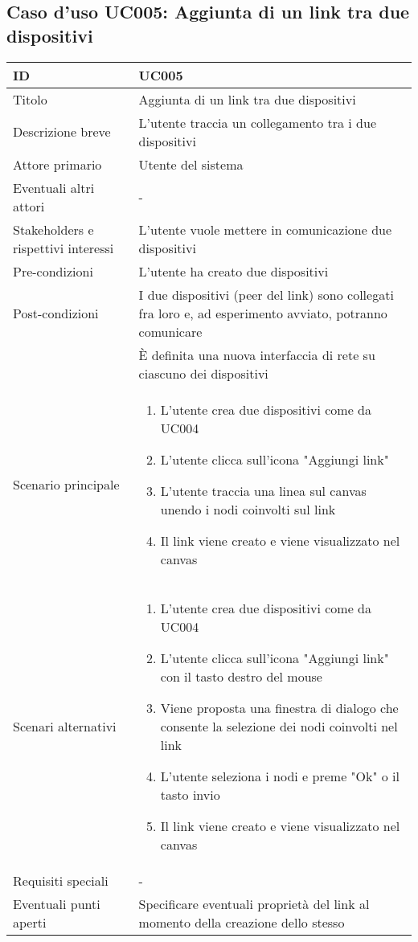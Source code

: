 \documentclass[../../main.tex]{subfiles}
\begin{document}
\subsection{Caso d’uso UC005: Aggiunta di un link tra due dispositivi }
\begin{tabularx}{150mm}{|l|X|}
    \hline
    ID                                  & \textbf{UC005}\\
    \hline
    Titolo                              & Aggiunta di un link tra due dispositivi \\
    \hline
    Descrizione breve                   & L'utente traccia un collegamento tra i due dispositivi   \\
    \hline
    Attore primario                     & Utente del sistema   \\
    \hline
    Eventuali altri attori              & -  \\
    \hline
    Stakeholders e rispettivi interessi & L'utente vuole mettere in comunicazione due dispositivi   \\
    \hline
    Pre-condizioni                      & L'utente ha creato due dispositivi   \\
    \hline
    Post-condizioni                     & I due dispositivi (peer del link) sono collegati fra loro e, ad esperimento avviato, potranno comunicare   \\
    & \`E definita una nuova interfaccia di rete su ciascuno dei dispositivi\\
    \hline
    Scenario principale                 &
    \begin {enumerate}
\item L'utente crea due dispositivi come da UC004
\item L'utente clicca sull'icona "Aggiungi link"
\item L'utente traccia una linea sul canvas unendo i nodi coinvolti sul link
\item Il link viene creato e viene visualizzato nel canvas
    \end {enumerate}
    \\
    \hline
    Scenari alternativi                 &    
    \begin {enumerate}
\item L'utente crea due dispositivi come da UC004
\item L'utente clicca sull'icona "Aggiungi link" con il tasto destro del mouse
\item Viene proposta una finestra di dialogo che consente la selezione dei nodi coinvolti nel link 
\item L'utente seleziona i nodi e preme "Ok" o il tasto invio
\item Il link viene creato e viene visualizzato nel canvas
    \end {enumerate} \\

    \hline
    Requisiti speciali                  &    -\\
    \hline
    Eventuali punti aperti              &    Specificare eventuali proprietà del link al momento della creazione dello stesso\\
    \hline
\end{tabularx}
\newpage
\end{document}
